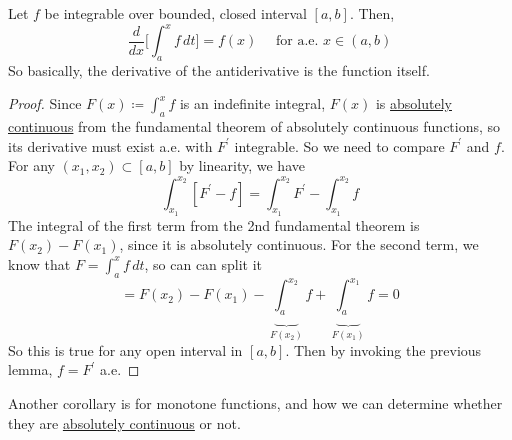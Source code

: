   \begin{corollary}
    \label{thm:first-fundamental-theorem-of-calculus}
    Let $f$ be integrable over bounded, closed interval $[a, b]$. Then, 
    \begin{equation}
      \frac{d}{dx} \bigg[ \int_a^x f \,dt \bigg] = f(x) \quad \text{ for a.e. } x \in (a, b)
    \end{equation}
    So basically, the derivative of the antiderivative is the function itself. 
  \end{corollary}
  \begin{proof}
    Since $F(x) \coloneqq \int_a^x f$ is an indefinite integral, $F(x)$ is \hyperref[def:absolutely-continuous-function]{absolutely continuous} from the fundamental theorem of absolutely continuous functions, so its derivative must exist a.e. with $F^\prime$ integrable. So we need to compare $F^\prime$ and $f$. For any $(x_1, x_2) \subset [a, b]$ by linearity, we have 
    \begin{equation}
      \int_{x_1}^{x_2} [ F^\prime - f ] = \int_{x_1}^{x_2} F^\prime - \int_{x_1}^{x_2} f 
    \end{equation}
    The integral of the first term from the 2nd fundamental theorem is $F(x_2) - F(x_1)$, since it is absolutely continuous. For the second term, we know that $F = \int_a^x f \,dt$, so can can split it 
    \begin{equation}
      = F(x_2) - F(x_1) - \underbrace{\int_a^{x_2}}_{F(x_2)} f + \underbrace{\int_{a}^{x_1}}_{F(x_1)} f = 0
    \end{equation}
    So this is true for any open interval in $[a, b]$. Then by invoking the previous lemma, $f = F^\prime$ a.e. 
  \end{proof}

  Another corollary is for monotone functions, and how we can determine whether they are \hyperref[def:absolutely-continuous-function]{absolutely continuous} or not. 

